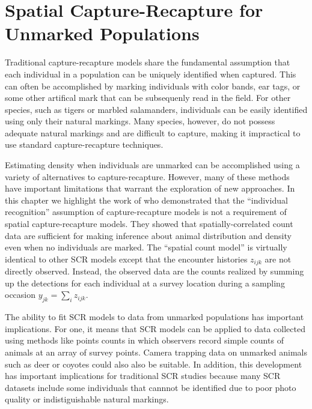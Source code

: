 


\chapter{Spatial Capture-Recapture for Unmarked Populations}
\label{chapt.scr-unmarked}

\vspace{0.3cm}


Traditional capture-recapture models share the fundamental
assumption that each individual in a population can be uniquely
identified when captured. This can often be accomplished
by marking individuals with color bands, ear tags, or some other
artifical mark that can be subsequenly read in the field. For other species, such as
tigers or marbled salamanders, individuals can be easily identified
using only their natural markings. Many species, however,
do not possess adequate natural markings and are
difficult to capture, making it impractical to use standard
capture-recapture techniques.

Estimating density when individuals are unmarked can be accomplished
using a variety of alternatives to capture-recapture. However, many of
these methods have important limitations that warrant the exploration
of new approaches.
In this chapter we highlight the work of \citet{chandler_royle:2012}
who demonstrated that the ``individual recognition'' assumption of
capture-recapture models is not a requirement of spatial capture-recapture
models. They showed that spatially-correlated count data are sufficient for
making inference about animal distribution and density even when no
individuals are marked.
The \citet{chandler_royle:2012} ``spatial count model''  is virtually identical to
other SCR models except that the encounter histories $z_{ijk}$ are not directly
observed. Instead, the observed data are the counts realized by
summing up the detections for each individual at
a survey location during a sampling occasion $y_{jk} = \sum_i
z_{ijk}$.

The ability to fit
SCR models to data from unmarked populations has important
implications. For one, it means that SCR models can
be applied to data collected using methods like points counts in which
observers record simple counts of animals at an array of survey
points. Camera trapping data on unmarked animals such as deer or
coyotes could also also be suitable. In addition, this development has
important implications for
traditional SCR studies because many SCR datasets include some
individuals that cannnot be identified due to poor photo quality or
indistiguishable natural markings.

